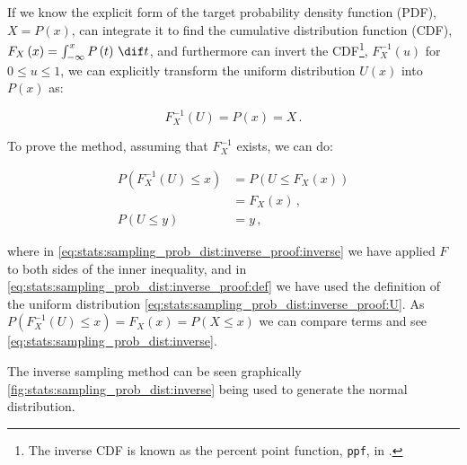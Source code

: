 If we know the explicit form of the target probability density function (PDF), $X = P\left(x\right)$,
can integrate it to find the cumulative distribution function (CDF), $F_{X}\left(x\right) = \int_{-\infty}^{x} P\left(t\right) \, \dif t$,
and furthermore can invert the CDF\footnote{The inverse CDF
is known as the percent point function, \texttt{ppf},
in \href{https://docs.scipy.org/doc/scipy-0.14.0/reference/stats.html}{\scipy}.}, $F^{-1}_{X}\left(u\right)$ for $0 \leq u \leq 1$,
we can explicitly transform the uniform distribution $U\left(x\right)$ into $P\left(x\right)$ as:

\begin{equation}\label{eq:stats:sampling_prob_dist:inverse}
F^{-1}_{X}\left(U\right) = P\left(x\right) = X\,.
\end{equation}

To prove the method, assuming that $F^{-1}_{X}$ exists, we can do:

\begin{subequations}\label{eq:stats:sampling_prob_dist:inverse_proof}
\begin{align}
P\left(F^{-1}_{X}\left(U\right) \leq x\right) &= P\left(U \leq F_{X}\left(x\right) \right) \label{eq:stats:sampling_prob_dist:inverse_proof:inverse} \\
&= F_{X}\left(x\right)\,,\label{eq:stats:sampling_prob_dist:inverse_proof:def} \\
P\left(U \leq y\right) &= y\,, \label{eq:stats:sampling_prob_dist:inverse_proof:U}
\end{align}
\end{subequations}

\noindent where in \cref{eq:stats:sampling_prob_dist:inverse_proof:inverse} we have applied $F$ to both sides of the inner inequality,
and in \cref{eq:stats:sampling_prob_dist:inverse_proof:def} we have used the definition of the uniform distribution \cref{eq:stats:sampling_prob_dist:inverse_proof:U}.
As $P\left(F^{-1}_{X}\left(U\right) \leq x\right) = F_{X}\left(x\right) = P\left(X \leq x\right)$
we can compare terms and see \cref{eq:stats:sampling_prob_dist:inverse}.

The inverse sampling method can be seen graphically \cref{fig:stats:sampling_prob_dist:inverse} being used to generate the normal distribution.


